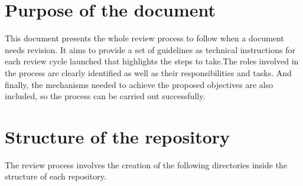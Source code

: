 \documentclass{template/openetcs_article}
\begin{document}
\newpage

\section[Introduction]{Purpose of the document}
This document presents the whole review process to follow when a document needs revision. It aims to provide a set of guidelines as technical instructions for each review cycle launched that highlights the steps to take.The roles involved in the process are clearly identified as well as their responsibilities and tasks. And finally, the mechanisms needed to achieve the proposed objectives are also included, so the process can be carried out successfully.

\section{Structure of the repository}
 
The review process involves the creation of the following directories inside the structure of each repository. 

\end{document}
